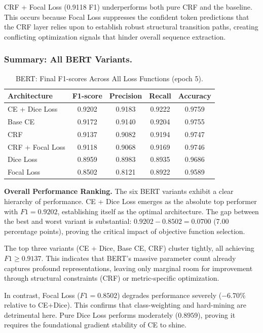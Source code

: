 \noindent CRF + Focal Loss (0.9118 F1) underperforms both pure CRF and the baseline. This occurs because Focal Loss suppresses the confident token predictions that the CRF layer relies upon to establish robust structural transition paths, creating conflicting optimization signals that hinder overall sequence extraction.

\subsubsection{Summary: All BERT Variants.}

\begin{table}[htbp]
    \centering
    \begin{tabular}{l c c c c}
        \hline
        \textbf{Architecture} & \textbf{F1-score} & \textbf{Precision} & \textbf{Recall} & \textbf{Accuracy} \\
        \hline
        CE + Dice Loss & 0.9202 & 0.9183 & 0.9222 & 0.9759 \\
        Base CE & 0.9172 & 0.9140 & 0.9204 & 0.9755 \\
        CRF & 0.9137 & 0.9082 & 0.9194 & 0.9747 \\
        CRF + Focal Loss & 0.9118 & 0.9068 & 0.9169 & 0.9746 \\
        Dice Loss & 0.8959 & 0.8983 & 0.8935 & 0.9686 \\
        Focal Loss & 0.8502 & 0.8121 & 0.8922 & 0.9589 \\
        \hline
    \end{tabular}
    \caption{BERT: Final F1-scores Across All Loss Functions (epoch 5).}
    \label{tab:bert_summary}
\end{table}

\noindent \textbf{Overall Performance Ranking.} The six BERT variants exhibit a clear hierarchy of performance. CE + Dice Loss emerges as the absolute top performer with $F1 = 0.9202$, establishing itself as the optimal architecture. The gap between the best and worst variant is substantial: $0.9202 - 0.8502 = 0.0700$ (7.00 percentage points), proving the critical impact of objective function selection.

\noindent The top three variants (CE + Dice, Base CE, CRF) cluster tightly, all achieving $F1 \ge 0.9137$. This indicates that BERT's massive parameter count already captures profound representations, leaving only marginal room for improvement through structural constraints (CRF) or metric-specific optimization.

\noindent In contrast, Focal Loss ($F1 = 0.8502$) degrades performance severely ($-6.70\%$ relative to CE+Dice). This confirms that class-weighting and hard-mining are detrimental here. Pure Dice Loss performs moderately ($0.8959$), proving it requires the foundational gradient stability of CE to shine.

